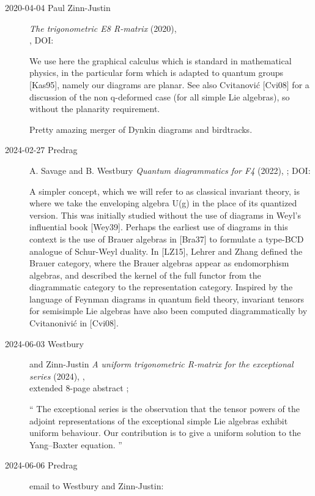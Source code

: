 \begin{description}
\item[2020-04-04 Paul Zinn-Justin]
{\em The trigonometric E8 R-matrix} (2020), 
\\
,
 {DOI}:

We use here the graphical calculus which is standard in mathematical
physics, in the particular form which is adapted to quantum groups
[Kas95], namely our diagrams are planar. See also Cvitanovi{\'c} [Cvi08] for
a discussion of the non q-deformed case (for all simple Lie algebras), so
without the planarity requirement.

Pretty amazing merger of Dynkin diagrams and birdtracks.

\item[2024-02-27 Predrag]
A. Savage and B. Westbury
{\em Quantum diagrammatics for F4} (2022), ;
 {DOI}:

A simpler concept, which we will refer to as classical invariant theory,
is where we take the enveloping algebra U(g) in the place of its
quantized version. This was initially studied without the use of diagrams
in Weyl’s influential book [Wey39]. Perhaps the earliest use of diagrams
in this context is the use of Brauer algebras in [Bra37] to formulate a
type-BCD analogue of Schur-Weyl duality. In [LZ15], Lehrer and Zhang
defined the Brauer category, where the Brauer algebras appear as
endomorphism algebras, and described the kernel of the full functor from
the diagrammatic category to the representation category. Inspired by the
language of Feynman diagrams in quantum field theory, invariant tensors
for semisimple Lie algebras have also been computed diagrammatically by
Cvitanonivi\'c in [Cvi08].

\item[2024-06-03 Westbury] and Zinn-Justin %
{\em A uniform trigonometric R-matrix for the exceptional series} (2024),
,\\ 
extended 8-page abstract ;

``
The exceptional series is the observation that the tensor powers of the
adjoint representations of the exceptional simple Lie algebras exhibit uniform behaviour.
Our contribution is to give a uniform solution to the Yang–Baxter equation.
''

\item[2024-06-06 Predrag] email to  Westbury and Zinn-Justin:


\end{description}
